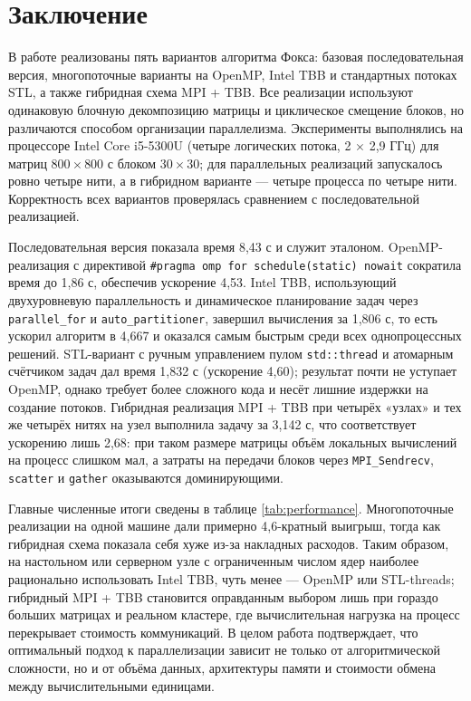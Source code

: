 \documentclass[12pt,a4paper]{extarticle}
\begin{document}
\begin{itemize}
\end{itemize}
\newpage

\section*{Заключение}


В работе реализованы пять вариантов алгоритма Фокса: базовая последовательная версия, многопоточные варианты на OpenMP, Intel TBB и стандартных потоках STL, а также гибридная схема MPI + TBB. Все реализации используют одинаковую блочную декомпозицию матрицы и циклическое смещение блоков, но различаются способом организации параллелизма. Эксперименты выполнялись на процессоре Intel Core i5-5300U (четыре логических потока, 2 $\times$ 2,9 ГГц) для матриц $800\times800$ с блоком $30\times30$; для параллельных реализаций запускалось ровно четыре нити, а в гибридном варианте — четыре процесса по четыре нити. Корректность всех вариантов проверялась сравнением с последовательной реализацией.

Последовательная версия показала время 8,43 с и служит эталоном. OpenMP-реализация с директивой \texttt{\#pragma omp for schedule(static)\,nowait} сократила время до 1,86 с, обеспечив ускорение 4,53. Intel TBB, использующий двухуровневую параллельность и динамическое планирование задач через \texttt{parallel\_for} и \texttt{auto\_partitioner}, завершил вычисления за 1,806 с, то есть ускорил алгоритм в 4,667 и оказался самым быстрым среди всех однопроцессных решений. STL-вариант с ручным управлением пулом \texttt{std::thread} и атомарным счётчиком задач дал время 1,832 с (ускорение 4,60); результат почти не уступает OpenMP, однако требует более сложного кода и несёт лишние издержки на создание потоков. Гибридная реализация MPI + TBB при четырёх «узлах» и тех же четырёх нитях на узел выполнила задачу за 3,142 с, что соответствует ускорению лишь 2,68: при таком размере матрицы объём локальных вычислений на процесс слишком мал, а затраты на передачи блоков через \texttt{MPI\_Sendrecv}, \texttt{scatter} и \texttt{gather} оказываются доминирующими.

Главные численные итоги сведены в таблице \ref{tab:performance}. Многопоточные реализации на одной машине дали примерно 4,6-кратный выигрыш, тогда как гибридная схема показала себя хуже из-за накладных расходов. Таким образом, на настольном или серверном узле с ограниченным числом ядер наиболее рационально использовать Intel TBB, чуть менее — OpenMP или STL-threads; гибридный MPI + TBB становится оправданным выбором лишь при гораздо больших матрицах и реальном кластере, где вычислительная нагрузка на процесс перекрывает стоимость коммуникаций. В целом работа подтверждает, что оптимальный подход к параллелизации зависит не только от алгоритмической сложности, но и от объёма данных, архитектуры памяти и стоимости обмена между вычислительными единицами.
\newpage
\end{document}
